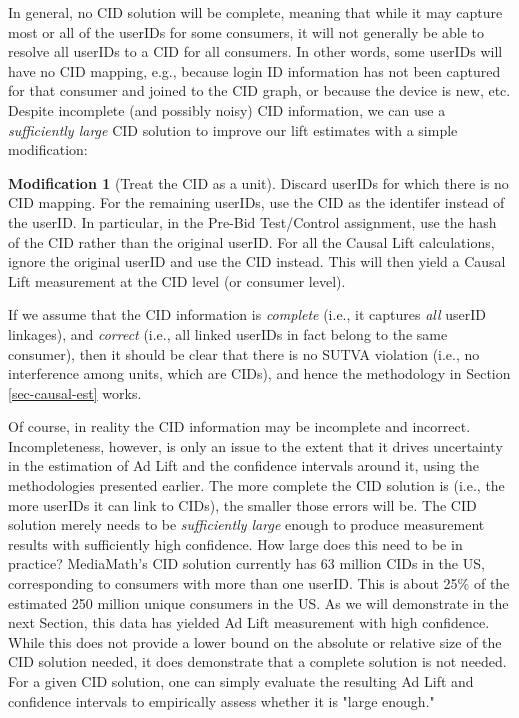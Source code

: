 \documentclass[11pt,a4paper]{article}
\theoremstyle{definition}
\theoremstyle{remark}
\theoremstyle{definition}
\theoremstyle{definition}
\theoremstyle{definition}
\theoremstyle{definition}
\theoremstyle{definition}
\newtheorem{modification}{Modification}[section]
\theoremstyle{definition}
\begin{document}
In general, no CID solution will be complete, meaning that while it may capture most or all of the userIDs for some consumers, it will not generally be able to resolve all userIDs to a CID for all consumers. In other words, some userIDs will have no CID mapping, e.g., because login ID information has not been captured for that consumer and joined to the CID graph, or because the device is new, etc. Despite incomplete (and possibly noisy) CID information, we can use a {\em sufficiently large} CID solution to improve our lift estimates with a simple modification: 

\begin{modification}[Treat the CID as a unit]
Discard userIDs for which there is no CID mapping. For the remaining userIDs, use the CID as the identifer instead of the userID. In particular, in the Pre-Bid Test/Control assignment, use the hash of the CID rather than the original userID. For all the Causal Lift calculations, ignore the original userID and use the CID instead. This will then yield a Causal Lift measurement at the CID level (or consumer level).
\end{modification}

If we assume that the CID information is \textit{complete} (i.e., it captures \textit{all} userID linkages), and \textit{correct} (i.e., all linked userIDs in fact belong to the same consumer), then it should be clear that there is no SUTVA violation (i.e., no interference among units, which are CIDs), and hence the methodology in Section \ref{sec-causal-est} works. 

Of course, in reality the CID information may be incomplete and incorrect. Incompleteness, however, is only an issue to the extent that it drives uncertainty in the estimation of Ad Lift and the confidence intervals around it, using the methodologies presented earlier. The more complete the CID solution is (i.e., the more userIDs it can link to CIDs), the smaller those errors will be. The CID solution merely needs to be {\em sufficiently large} enough to produce measurement results with sufficiently high confidence. How large does this need to be in practice? MediaMath's CID solution currently has 63 million CIDs in the US, corresponding to consumers with more than one userID. This is about 25\% of the estimated 250 million unique consumers in the US. As we will demonstrate in the next Section, this data has yielded Ad Lift measurement with high confidence. While this does not provide a lower bound on the absolute or relative size of the CID solution needed, it does demonstrate that a complete solution is not needed. For a given CID solution, one can simply evaluate the resulting Ad Lift and confidence intervals to empirically assess whether it is "large enough."
\end{document}
